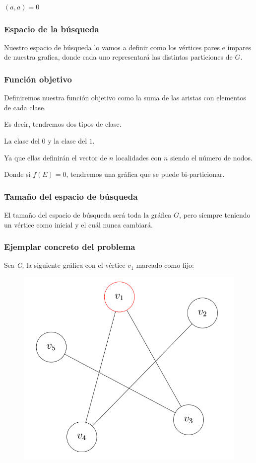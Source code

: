 \documentclass{article}
\begin{document}
$(a,a)=0$

\subsubsection*{Espacio de la búsqueda}

Nuestro espacio de búsqueda lo vamos a definir como los vértices 
pares e impares de nuestra grafica, donde cada uno representará
las distintas particiones de $G$.

\subsubsection*{Función objetivo}
Definiremos nuestra función objetivo como la suma de las aristas con
elementos de cada clase.

Es decir, tendremos dos tipos de clase.

La clase del $0$ y la clase del $1$.

Ya que ellas definirán el vector de $n$ localidades con $n$ 
siendo el número de nodos.

Donde si $f(E) = 0$, tendremos una gráfica que se puede 
bi-particionar.

\subsubsection*{Tamaño del espacio de búsqueda}
El tamaño del espacio de búsqueda será toda la gráfica $G$, pero
siempre teniendo un vértice como inicial y el cuál nunca cambiará.
\subsubsection*{Ejemplar concreto del problema}
Sea \textit{G}, la siguiente gráfica con el vértice $v_1$ marcado como 
fijo:
\begin{figure}[h]
\begin{center}
\includegraphics[scale=0.25]{./img/graphExample}
\end{center}
\end{figure}
\end{document}
